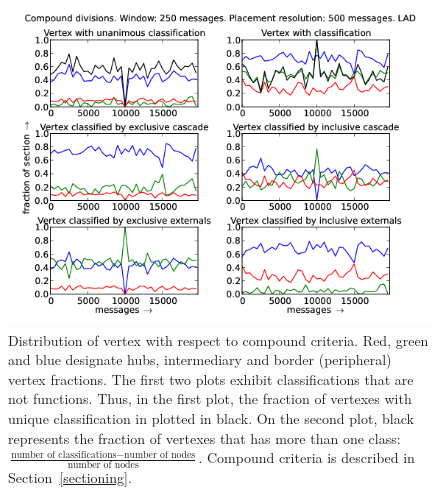 \documentclass[%
 aip,
 jmp,%
 amsmath,amssymb,
 reprint,%
]{revtex4-1}
\begin{document}
\begin{figure}[hbtp] 
   \centering
        \includegraphics[width=\textwidth]{figs/LAD/250_2}
    \caption{Distribution of vertex with respect to compound criteria. Red, green and blue designate hubs, intermediary and border (peripheral) vertex fractions. The first two plots exhibit classifications that are not functions. Thus, in the first plot, the fraction of vertexes with unique classification in plotted in black. On the second plot, black represents the fraction of vertexes that has more than one class: $\frac{\text{number of classifications} - \text{number of nodes}}{\text{number of nodes}}$. Compound criteria is described in Section~\ref{sectioning}.}
    \label{fig:lad250_}
\end{figure}
\end{document}
